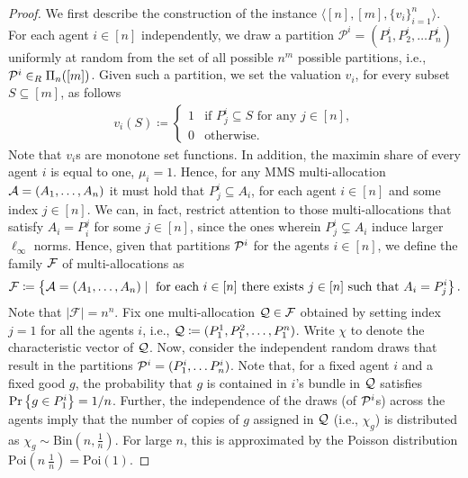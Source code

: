 \begin{proof} We first describe the construction of the instance $\langle [n], [m], \{v_i\}_{i=1}^n \rangle$. For each agent $i \in [n]$ independently, we draw a partition $\mathcal{P}^i =(P^i_1, P^i_2, \ldots P^i_n)$ uniformly at random from the set of all possible $n^m$ possible partitions, i.e., $\mathcal{P}^i \in_R \Pi_n([m])$. Given such a partition, we set the valuation $v_i$, for every subset $S \subseteq [m]$, as follows 
\begin{align*}
    v_i(S) \coloneqq \begin{cases}
    1 & \text{if }  P_j^i \subseteq S \text{ for any }j\in[n], \\
    0 & \text{otherwise}.
\end{cases}
\end{align*}
Note that $v_i$s are monotone set functions. In addition, the maximin share of every agent $i$ is equal to one, $\mu_i=1$. Hence, for any MMS multi-allocation $\mathcal{A}=(A_1,\ldots,A_n)$ it must hold that $P^i_j \subseteq A_i$, for each agent $i \in [n]$ and some index $j \in [n]$. We can, in fact, restrict attention to those multi-allocations that satisfy $A_i=P_i^j$ for some $j \in [n]$, since the ones wherein $P^i_j \subsetneq A_i$ induce larger $\ell_\infty$ norms. Hence, given that partitions $\mathcal{P}^i$ for the agents $i \in [n]$, we define the family $\mathcal{F}$ of multi-allocations as 
\begin{align*}
    \mathcal{F} \coloneqq \left\{ \mathcal{A}=(A_1,\ldots,A_n) \mid \text{ for each } i\in[n] \text{ there exists } j\in[n] \text{ such that } A_i=P^i_j\right\}.
\end{align*}
Note that $|\mathcal{F}|=n^n$. Fix one multi-allocation $\mathcal{Q} \in \mathcal{F}$ obtained by setting index $j=1$ for all the agents $i$, i.e., $\mathcal{Q} \coloneqq (P^1_1, P^2_1,\ldots, P^n_1)$. Write $\chi$ to denote the characteristic vector of $\mathcal{Q}$. Now, consider the independent random draws that result in the  partitions $\mathcal{P}^i=(P^i_1, \ldots P^i_n)$. Note that, for a fixed agent $i$ and a fixed good $g$, the probability that $g$ is contained in $i$'s bundle in $\mathcal{Q}$ satisfies $\Pr \left\{g \in P^i_1\right\} = 1/n$. Further, the independence of the draws (of $\mathcal{P}^i$s) across the agents imply that the number of copies of $g$ assigned in $\mathcal{Q}$ (i.e., $\chi_g$) is distributed as $\chi_g \sim \mathrm{Bin}(n, \frac{1}{n})$. For large $n$, this is approximated by the Poisson distribution $\mathrm{Poi}(n \  \frac{1}{n}) = \mathrm{Poi}(1)$. 
 

\end{proof}
